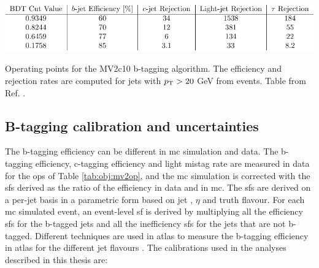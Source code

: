 \begin{table}[h]
\begin{center}
    \includegraphics[width=1.0\textwidth]{figures/objects/btag_op.pdf}  
\end{center}
 \caption{Operating points for the MV2c10 b-tagging algorithm. The efficiency and rejection rates are computed for jets with $p_{\rm T} > 20$ GeV from \ttbar events. Table from Ref. \cite{ATL-PHYS-PUB-2016-012}.}
  \label{tab:obj:mv2op}
\end{table}

\subsection{B-tagging calibration and uncertainties}

The b-tagging efficiency can be different in \gls{mc} simulation and data. The b-tagging efficiency, 
c-tagging efficiency and light mistag rate are measured in data for the \glspl{op} of Table \ref{tab:obj:mv2op}, 
and the \gls{mc} simulation is corrected with the \glspl{sf} derived as the ratio of the efficiency in data and in \gls{mc}. 
The \glspl{sf} are derived on a per-jet basis in a parametric form based on jet \pt, $\eta$ and truth flavour. 
For each \gls{mc} simulated event, an event-level \gls{sf} is derived by multiplying all the efficiency \glspl{sf} for the b-tagged jets 
and all the inefficiency \glspl{sf} for the jets that are not b-tagged. Different techniques are used in \gls{atlas} to measure the b-tagging 
efficiency in \gls{atlas} for the different jet flavours \cite{1748-0221-11-04-P04008}.
The calibrations used in the analyses described in this thesis are:


